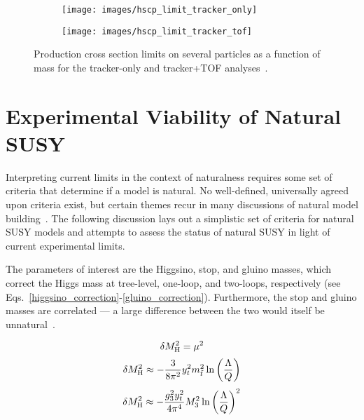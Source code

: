 \documentclass[12pt]{article}
\begin{document}
        \noindent \begin{figure}[htbp] \begin{center}
        \begin{subfigure}[htbp]{0.45\textwidth} \begin{center}
        \texttt{[image: images/hscp\_limit\_tracker\_only]}
        \end{center} \end{subfigure}
        \begin{subfigure}[htbp]{0.45\textwidth} \begin{center}
        \texttt{[image: images/hscp\_limit\_tracker\_tof]}
        \end{center} \end{subfigure}
        \caption{Production cross section limits on several particles as a function of mass for the tracker-only and tracker+TOF analyses~\cite{cms_hscp}.}
        \label{hscp_limits}
        \end{center} \end{figure}

\section{Experimental Viability of Natural SUSY}
    Interpreting current limits in the context of naturalness requires some set of criteria that determine if a model is natural. No well-defined, universally agreed upon criteria exist, but certain themes recur in many discussions of natural model building~\cite{craig, vestiges, evans_toward_full, feng, cornering, kim}. The following discussion lays out a simplistic set of criteria for natural SUSY models and attempts to assess the status of natural SUSY in light of current experimental limits.
    
    The parameters of interest are the Higgsino, stop, and gluino masses, which correct the Higgs mass at tree-level, one-loop, and two-loops, respectively (see Eqs.~\ref{higgsino_correction}-\ref{gluino_correction}). Furthermore, the stop and gluino masses are correlated --- a large difference between the two would itself be unnatural~\cite{cornering}.

    \noindent \begin{equation}
        \delta M_{\mathrm{H}}^2 = \mu^2
        \label{higgsino_correction}
    \end{equation}
    \noindent \begin{equation}
        \delta M_{\mathrm{H}}^2 \approx - \frac{3}{8\pi^2} y_t^2 m_{\tilde{t}}^2 \ln{\left(\frac{\Lambda}{Q}\right)}
        \label{stop_correction}
    \end{equation}
    \noindent \begin{equation}
        \delta M_{\mathrm{H}}^2 \approx - \frac{g_3^2 y_t^2}{4\pi^4} M_3^2 \ln{\left(\frac{\Lambda}{Q}\right)}^2
        \label{gluino_correction}
    \end{equation}
\end{document}
